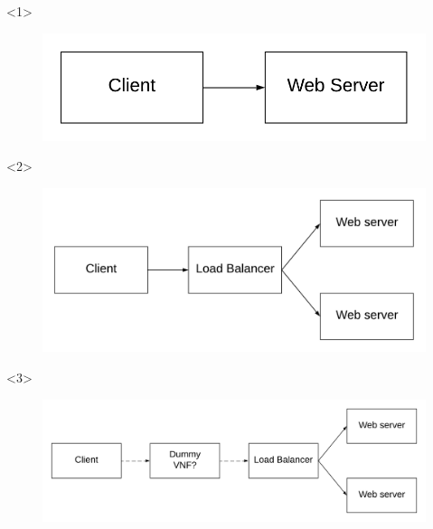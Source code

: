 \documentclass{beamer}
\begin{document}
\begin{frame}
\begin{onlyenv}<1>
	
	\begin{figure}
		\centering
		\includegraphics[width=1\linewidth]{images/1}
		\label{fig:1}
	\end{figure}
	
\end{onlyenv}

\begin{onlyenv}<2>
	
	\begin{figure}
		\centering
		\includegraphics[width=1\linewidth]{images/2}
		\label{fig:2}
	\end{figure}
	
\end{onlyenv}

\begin{onlyenv}<3>
	
	\begin{figure}
		\centering
		\includegraphics[width=1\linewidth]{images/3}
		\label{fig:3}
	\end{figure}
	
\end{onlyenv}


\end{frame}
\end{document}
